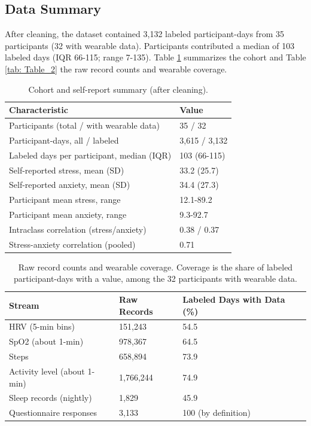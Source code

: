\documentclass[11pt, a4paper, oneside]{article}
\begin{document}
\subsection{Data Summary}
After cleaning, the dataset contained 3,132 labeled participant-days from 35 participants (32 with wearable data). Participants contributed a median of 103 labeled days (IQR 66-115; range 7-135). Table \ref{tab:Table_1} summarizes the cohort and Table \ref{tab: Table_2} the raw record counts and wearable coverage.

\begin{table}[H]
    \centering
    \caption{Cohort and self-report summary (after cleaning).}
    \begin{tabularx}{\textwidth}{XX}
        \toprule
        \textbf{Characteristic} & \textbf{Value}\\
        \midrule
        Participants (total / with wearable data) & 35 / 32\\
        Participant-days, all / labeled & 3,615 / 3,132\\
        Labeled days per participant, median (IQR) & 103 (66-115)\\
        Self-reported stress, mean (SD) & 33.2 (25.7)\\
        Self-reported anxiety, mean (SD) & 34.4 (27.3)\\
        Participant mean stress, range & 12.1-89.2\\
        Participant mean anxiety, range & 9.3-92.7\\
        Intraclass correlation (stress/anxiety) & 0.38 / 0.37\\
        Stress-anxiety correlation (pooled) & 0.71\\
        \bottomrule
    \end{tabularx}
    \label{tab:Table_1}
\end{table}

\begin{table}[H]
    \centering
    \caption{Raw record counts and wearable coverage. Coverage is the share of labeled participant-days with a value, among the 32 participants with wearable data.}
    \begin{tabularx}{\textwidth}{XXX}
        \toprule
        \textbf{Stream} & \textbf{Raw Records} & \textbf{Labeled Days with Data (\%)}\\
        \midrule
        HRV (5-min bins) & 151,243 & 54.5\\
        SpO2 (about 1-min) & 978,367 & 64.5\\
        Steps & 658,894 & 73.9\\
        Activity level (about 1-min) & 1,766,244 & 74.9\\
        Sleep records (nightly) & 1,829 & 45.9\\
        Questionnaire responses & 3,133 & 100 (by definition)\\
        \bottomrule
    \end{tabularx}
    \label{tab:Table_2}
\end{table}
\end{document}
